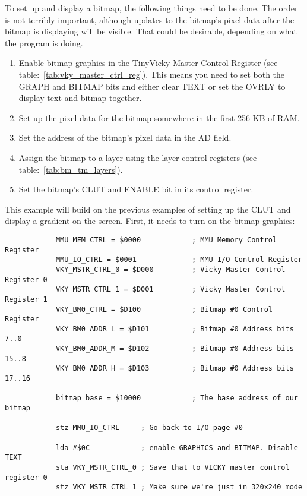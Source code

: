 To set up and display a bitmap, the following things need to be done. The order is not terribly important, although updates to the bitmap's pixel data after the bitmap is displaying will be visible. That could be desirable, depending on what the program is doing.

\begin{enumerate}
    \item Enable bitmap graphics in the TinyVicky Master Control Register (see table:~\ref{tab:vky_master_ctrl_reg}). This means you need to set both the GRAPH and BITMAP bits and either clear TEXT or set the OVRLY to display text and bitmap together.

    \item Set up the pixel data for the bitmap somewhere in the first 256 KB of RAM.

    \item Set the address of the bitmap's pixel data in the AD field.

    \item Assign the bitmap to a layer using the layer control registers (see table:~\ref{tab:bm_tm_layers}).

    \item Set the bitmap's CLUT and ENABLE bit in its control register.
\end{enumerate}

\label{ex:bitmap}

This example will build on the previous examples of setting up the CLUT and display a gradient on the screen. First, it needs to turn on the bitmap graphics:

\begin{verbatim}
            MMU_MEM_CTRL = $0000            ; MMU Memory Control Register
            MMU_IO_CTRL = $0001             ; MMU I/O Control Register
            VKY_MSTR_CTRL_0 = $D000         ; Vicky Master Control Register 0
            VKY_MSTR_CTRL_1 = $D001         ; Vicky Master Control Register 1
            VKY_BM0_CTRL = $D100            ; Bitmap #0 Control Register
            VKY_BM0_ADDR_L = $D101          ; Bitmap #0 Address bits 7..0
            VKY_BM0_ADDR_M = $D102          ; Bitmap #0 Address bits 15..8
            VKY_BM0_ADDR_H = $D103          ; Bitmap #0 Address bits 17..16

            bitmap_base = $10000            ; The base address of our bitmap

            stz MMU_IO_CTRL     ; Go back to I/O page #0

            lda #$0C            ; enable GRAPHICS and BITMAP. Disable TEXT
            sta VKY_MSTR_CTRL_0 ; Save that to VICKY master control register 0
            stz VKY_MSTR_CTRL_1 ; Make sure we're just in 320x240 mode
\end{verbatim}


